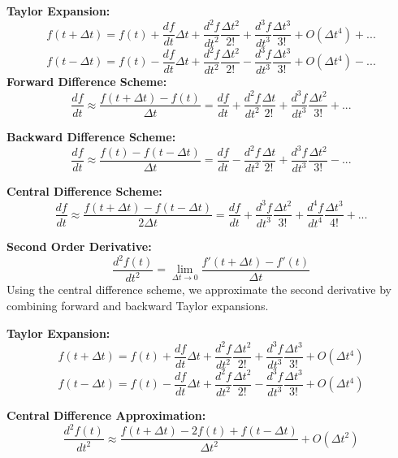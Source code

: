 \documentclass[10pt, aspectratio=54]{beamer}
\begin{document}
	\begin{frame}{}
		\justifying
		\textbf{Taylor Expansion:}
		\[
		f(t + \Delta t) = f(t) + \frac{d f}{d t} \Delta t + \frac{d^2 f}{d t^2} \frac{\Delta t^2}{2!} + \frac{d^3 f}{d t^3} \frac{\Delta t^3}{3!} + O(\Delta t^4) + ...
		\]
		\[
		f(t - \Delta t) = f(t) - \frac{d f}{d t} \Delta t + \frac{d^2 f}{d t^2} \frac{\Delta t^2}{2!} - \frac{d^3 f}{d t^3} \frac{\Delta t^3}{3!} + O(\Delta t^4) - ...
		\]
		\textbf{Forward Difference Scheme:}
		\[
		\frac{d f}{d t} \approx \frac{f(t + \Delta t) - f(t)}{\Delta t} = \frac{d f}{d t} + \frac{d^2 f}{d t^2} \frac{\Delta t}{2!} + \frac{d^3 f}{d t^3} \frac{\Delta t^2}{3!} + ...
		\]
		
		\textbf{Backward Difference Scheme:}
		\[
		\frac{d f}{d t} \approx \frac{f(t) - f(t - \Delta t)}{\Delta t} =  \frac{d f}{d t} - \frac{d^2 f}{d t^2} \frac{\Delta t}{2!} + \frac{d^3 f}{d t^3} \frac{\Delta t^2}{3!} - ...
		\]
		
		\textbf{Central Difference Scheme:}
		\[
		\frac{d f}{d t} \approx \frac{f(t + \Delta t) - f(t - \Delta t)}{2\Delta t} =  \frac{d f}{d t} +  \frac{d^3 f}{d t^3} \frac{\Delta t^2}{3!} + \frac{d^4 f}{d t^4} \frac{\Delta t^3}{4!} + ...
		\]
	\end{frame}
	
	\begin{frame}{}
		\justifying
		\textbf{Second Order Derivative:}
		\[
		\frac{d^2 f(t)}{d t^2} = \lim_{\Delta t \to 0} \frac{f'(t + \Delta t) - f'(t)}{\Delta t}
		\]
		Using the central difference scheme, we approximate the second derivative by combining forward and backward Taylor expansions.
		
		\vspace{0.3cm}
		
		\textbf{Taylor Expansion:}
		\[
		f(t + \Delta t) = f(t) + \frac{d f}{d t} \Delta t + \frac{d^2 f}{d t^2} \frac{\Delta t^2}{2!} + \frac{d^3 f}{d t^3} \frac{\Delta t^3}{3!} + O(\Delta t^4)
		\]
		\[
		f(t - \Delta t) = f(t) - \frac{d f}{d t} \Delta t + \frac{d^2 f}{d t^2} \frac{\Delta t^2}{2!} - \frac{d^3 f}{d t^3} \frac{\Delta t^3}{3!} + O(\Delta t^4)
		\]
		
		\vspace{0.3cm}
		
		\textbf{Central Difference Approximation:}
		\[
		\frac{d^2 f(t)}{d t^2} \approx \frac{f(t + \Delta t) - 2f(t) + f(t - \Delta t)}{\Delta t^2} + O(\Delta t^2)
		\]
	\end{frame}
\end{document}
